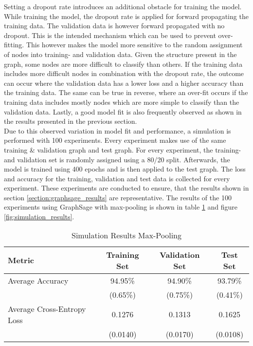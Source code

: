   \noindent Setting a dropout rate introduces an additional obstacle
  for training the model. While training the model, the dropout rate is
  applied for forward propagating the training data. The validation data is 
  however forward propagated with no dropout. This is the intended mechanism
  which can be used to prevent over-fitting. This however makes the model more
  sensitive to the random assignment of nodes into training- and validation
  data. Given the structure present in the graph, some nodes are more difficult
  to classify than others. If the training data includes more difficult nodes
  in combination with the dropout rate, the outcome can occur where the
  validation data has a lower loss and a higher accuracy than the training
  data. The same can be true in reverse, where an over-fit occurs if the
  training data includes mostly nodes which are more simple to classify than
  the validation data. Lastly, a good model fit is also frequently observed as
  shown in the results presented in the previous section. \\

  \noindent Due to this observed variation in model fit and performance, a
  simulation is performed with 100 experiments. Every experiment makes use of
  the same training \& validation graph and test graph. For every experiment,
  the training- and validation set is randomly assigned using a 80/20 split.
  Afterwards, the model is trained using 400 epochs and is then applied to the
  test graph. The loss and accuracy for the training, validation and test data
  is collected for every experiment. These experiments are conducted to
  ensure, that the results shown in section \ref{section:graphsage_results} are
  representative. The results of the 100 experiments using GraphSage with
  max-pooling is shown in table \ref{table:simulation_results} and figure 
  \ref{fig:simulation_results}. 

  \begin{table}[h]
    \centering
      \begin{tabular}{|l||c|c|c|}
      \hline
      \textbf{Metric} & \textbf{Training Set} & \textbf{Validation Set} & 
      \textbf{Test Set}\\
      \hline\hline
      Average Accuracy & 94.95\% & 94.90\% & 93.79\% \\\hline 
                       & (0.65\%) & (0.75\%) & (0.41\%) \\\hline
      Average Cross-Entropy Loss & 0.1276 & 0.1313 & 0.1625 \\\hline
                                 & (0.0140) & (0.0170) & (0.0108) \\
      \hline
    \end{tabular}
    \caption{Simulation Results Max-Pooling}
    \label{table:simulation_results}
  \end{table}


